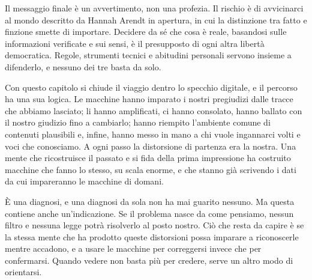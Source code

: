 Il messaggio finale è un avvertimento, non una profezia. Il rischio è di avvicinarci al mondo descritto da Hannah Arendt in apertura, in cui la distinzione tra fatto e finzione smette di importare. Decidere da sé che cosa è reale, basandosi sulle informazioni verificate e sui sensi, è il presupposto di ogni altra libertà democratica. Regole, strumenti tecnici e abitudini personali servono insieme a difenderlo, e nessuno dei tre basta da solo.

Con questo capitolo si chiude il viaggio dentro lo specchio digitale, e il percorso ha una sua logica. Le macchine hanno imparato i nostri pregiudizi dalle tracce che abbiamo lasciato; li hanno amplificati, ci hanno consolato, hanno ballato con il nostro giudizio fino a cambiarlo; hanno riempito l'ambiente comune di contenuti plausibili e, infine, hanno messo in mano a chi vuole ingannarci volti e voci che conosciamo. A ogni passo la distorsione di partenza era la nostra. Una mente che ricostruisce il passato e si fida della prima impressione ha costruito macchine che fanno lo stesso, su scala enorme, e che stanno già scrivendo i dati da cui impareranno le macchine di domani.

È una diagnosi, e una diagnosi da sola non ha mai guarito nessuno. Ma questa contiene anche un'indicazione. Se il problema nasce da come pensiamo, nessun filtro e nessuna legge potrà risolverlo al posto nostro. Ciò che resta da capire è se la stessa mente che ha prodotto queste distorsioni possa imparare a riconoscerle mentre accadono, e a usare le macchine per correggersi invece che per confermarsi. Quando vedere non basta più per credere, serve un altro modo di orientarsi.

